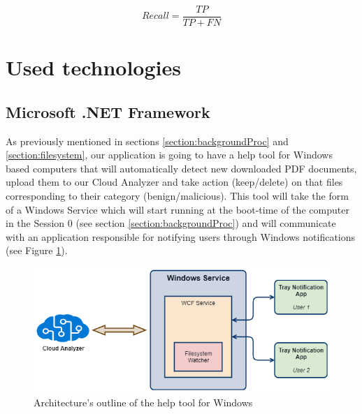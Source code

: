 \begin{equation}
	Recall = \frac{TP}{TP + FN}
\end{equation}






\section{Used technologies}
\label{section:technologies}
\subsection{Microsoft .NET Framework}
As previously mentioned in sections \ref{section:backgroundProc} and \ref{section:filesystem}, our application is going to have a help tool for Windows based computers that will automatically detect new downloaded PDF documents, upload them to our Cloud Analyzer and take action (keep/delete) on that files corresponding to their category (benign/malicious). This tool will take the form of a Windows Service which will start running at the boot-time of the computer in the Session 0 (see section \ref{section:backgroundProc}) and will communicate with an application responsible for notifying users through Windows notifications (see Figure \ref{winserviceDesign}). 

\begin{figure}[H]
	\centerline{\includegraphics[scale=0.6]{figures/winService.png}}  
	\caption{Architecture's outline of the help tool for Windows}
	\label{winserviceDesign}
\end{figure}

